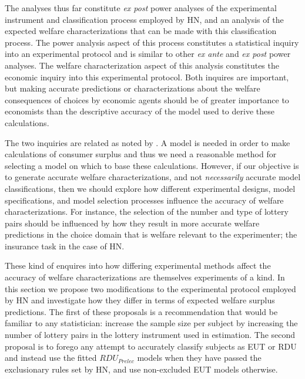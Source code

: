 \documentclass[../main.tex]{subfiles}
\begin{document}
The analyses thus far constitute \textit{ex post} power analyses of the experimental instrument and classification process employed by HN, and an analysis of the expected welfare characterizations that can be made with this classification process.
The power analysis aspect of this process constitutes a statistical inquiry into an experimental protocol and is similar to other \textit{ex ante} and \textit{ex post} power analyses.
The welfare characterization aspect of this analysis constitutes the economic inquiry into this experimental protocol.
Both inquires are important, but making accurate predictions or characterizations about the welfare consequences of choices by economic agents should be of greater importance to economists than the descriptive accuracy of the model used to derive these calculations.{\footnotemark}

\addtocounter{footnote}{-1}

The two inquiries are related as noted by \textcite[105]{Harrison2016}.
A model is needed in order to make calculations of consumer surplus and thus we need a reasonable method for selecting a model on which to base these calculations.
However, if our objective is to generate accurate welfare characterizations, and not \textit{necessarily} accurate model classifications, then we should explore how different experimental designs, model specifications, and model selection processes influence the accuracy of welfare characterizations.{\footnotemark}
For instance, the selection of the number and type of lottery pairs should be influenced by how they result in more accurate welfare predictions in the choice domain that is welfare relevant to the experimenter; the insurance task in the case of HN.


\addtocounter{footnote}{-1}

These kind of enquires into how differing experimental methods affect the accuracy of welfare characterizations are themselves experiments of a kind.
In this section we propose two modifications to the experimental protocol employed by HN and investigate how they differ in terms of expected welfare surplus predictions.
The first of these proposals is a recommendation that would be familiar to any statistician: increase the sample size per subject by increasing the number of lottery pairs in the lottery instrument used in estimation.
The second proposal is to forego any attempt to accurately classify subjects as EUT or RDU and instead use the fitted $\mathit{RDU_{Prelec}}$ models when they have passed the exclusionary rules set by HN, and use non-excluded EUT models otherwise.
\end{document}

